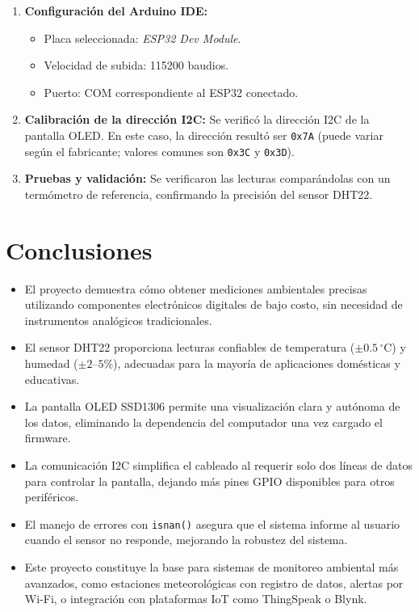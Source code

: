 \documentclass[12pt,a4paper]{article}
\begin{document}
\begin{enumerate}
    \item \textbf{Configuración del Arduino IDE:}
    \begin{itemize}
        \item Placa seleccionada: \textit{ESP32 Dev Module}.
        \item Velocidad de subida: 115200 baudios.
        \item Puerto: COM correspondiente al ESP32 conectado.
    \end{itemize}
    
    \item \textbf{Calibración de la dirección I2C:} Se verificó la dirección I2C de la pantalla OLED. En este caso, la dirección resultó ser \texttt{0x7A} (puede variar según el fabricante; valores comunes son \texttt{0x3C} y \texttt{0x3D}).
    
    \item \textbf{Pruebas y validación:} Se verificaron las lecturas comparándolas con un termómetro de referencia, confirmando la precisión del sensor DHT22.
\end{enumerate}

\section{Conclusiones}

\begin{itemize}
    \item El proyecto demuestra cómo obtener mediciones ambientales precisas utilizando componentes electrónicos digitales de bajo costo, sin necesidad de instrumentos analógicos tradicionales.
    \item El sensor DHT22 proporciona lecturas confiables de temperatura ($\pm 0.5\,^\circ$C) y humedad ($\pm 2$--$5$\%), adecuadas para la mayoría de aplicaciones domésticas y educativas.
    \item La pantalla OLED SSD1306 permite una visualización clara y autónoma de los datos, eliminando la dependencia del computador una vez cargado el firmware.
    \item La comunicación I2C simplifica el cableado al requerir solo dos líneas de datos para controlar la pantalla, dejando más pines GPIO disponibles para otros periféricos.
    \item El manejo de errores con \texttt{isnan()} asegura que el sistema informe al usuario cuando el sensor no responde, mejorando la robustez del sistema.
    \item Este proyecto constituye la base para sistemas de monitoreo ambiental más avanzados, como estaciones meteorológicas con registro de datos, alertas por Wi-Fi, o integración con plataformas IoT como ThingSpeak o Blynk.
\end{itemize}
\end{document}
